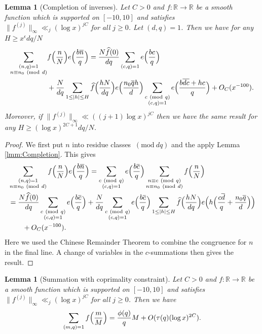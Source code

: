 \documentclass[10pt]{amsart}
\theoremstyle{plain}
\newtheorem{lmm}[thrm]{Lemma}
\numberwithin{equation}{section}
\newcommand{\Mod}[1]{\ (\mathrm{mod}\ #1)}
\renewcommand{\hat}[1]{\widehat #1}
\begin{document}
\begin{lmm}[Completion of inverses]\label{lmm:InverseCompletion}
Let $C>0$ and $f:\mathbb{R}\rightarrow\mathbb{R}$ be a smooth function which is supported on $[-10,10]$ and satisfies $\|f^{(j)}\|_\infty\ll_j (\log{x})^{j C}$ for all $j\ge 0$. Let $(d,q)=1$. Then we have for any $H\ge x^\epsilon d q/N$
\begin{align*}
\sum_{\substack{(n,q)=1\\ n\equiv n_0\Mod{d}}}&f\Bigl(\frac{n}{N}\Bigr)e\Bigl(\frac{b\overline{n}}{q}\Bigr)=\frac{N\hat{f}(0)}{d q}\sum_{(c,q)=1}e\Bigl(\frac{b c}{q}\Bigr)\\
&+\frac{N}{d q}\sum_{1\le |h|\le H}\hat{f}\Bigl(\frac{h N}{d q}\Bigr)e\Bigl(\frac{n_0\overline{q}h}{d}\Bigr)\sum_{\substack{c\Mod{q}\\ (c,q)=1}} e\Bigl(\frac{b\overline{ dc}+h c}{q}\Bigr)+O_C(x^{-100}).
\end{align*}
Moreover, if $\|f^{(j)}\|_\infty\ll ((j+1)\log{x})^{jC}$ then we have the same result for any $H\ge (\log{x})^{2C+1} dq/N$.
\end{lmm}
%
%
%
%
\begin{proof}
We first put $n$ into residue classes $\Mod{d q}$ and the apply Lemma \ref{lmm:Completion}. This gives
\begin{align*}
&\sum_{\substack{(n,q)=1\\ n\equiv n_0\Mod{d}}}f\Bigl(\frac{n}{N}\Bigr)e\Bigl(\frac{b\overline{n}}{q}\Bigr)=\sum_{\substack{c\Mod{q}\\ (c,q)=1}}e\Bigl(\frac{b\overline{c}}{q}\Bigr)\sum_{\substack{n\equiv c\Mod{q}\\ n\equiv n_0\Mod{d}}}f\Bigl(\frac{n}{N}\Bigr)\\
&=\frac{N\hat{f}(0)}{dq}\sum_{\substack{c\Mod{q}\\ (c,q)=1}}e\Bigl(\frac{b\overline{c}}{q}\Bigr)+\frac{N}{d q}\sum_{\substack{c\Mod{q}\\ (c,q)=1}}e\Bigl(\frac{b\overline{c}}{q}\Bigr)\sum_{1\le |h|\le H}\hat{f}\Bigl(\frac{h N}{d q}\Bigr)e\Bigl(h\Bigl(\frac{c \overline{d}}{q}+\frac{n_0\overline{q}}{d}\Bigr)\Bigr)\\
&\qquad +O_C(x^{-100}).
\end{align*}
Here we used the Chinese Remainder Theorem to combine the congruence for $n$ in the final line. A change of variables in the $c$-summations then gives the result.
\end{proof}
%
%
%
%
%
%
%
%
\begin{lmm}[Summation with coprimality constraint]\label{lmm:TrivialCompletion}
Let $C>0$ and $f:\mathbb{R}\rightarrow\mathbb{R}$ be a smooth function which is supported on $[-10,10]$ and satisfies $\|f^{(j)}\|_\infty\ll_j (\log{x})^{j C}$ for all $j\ge 0$. Then we have
\[
\sum_{(m,q)=1}f\Bigl(\frac{m}{M}\Bigr)=\frac{\phi(q)}{q}M+O(\tau(q)(\log{x})^{2C}).
\]
\end{lmm}
\end{document}
